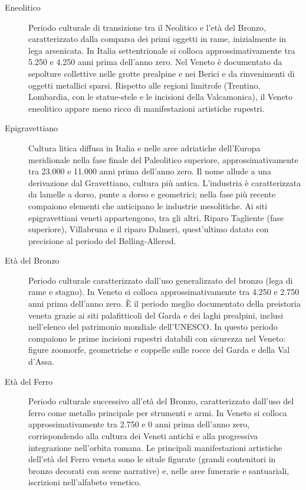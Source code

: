\begin{description}
\item[Eneolitico] Periodo culturale di transizione tra il Neolitico e l'età del Bronzo, caratterizzato dalla comparsa dei primi oggetti in rame, inizialmente in lega arsenicata. In Italia settentrionale si colloca approssimativamente tra 5.250 e 4.250 anni prima dell'anno zero. Nel Veneto è documentato da sepolture collettive nelle grotte prealpine e nei Berici e da rinvenimenti di oggetti metallici sparsi. Rispetto alle regioni limitrofe (Trentino, Lombardia, con le statue-stele e le incisioni della Valcamonica), il Veneto eneolitico appare meno ricco di manifestazioni artistiche rupestri.

\item[Epigravettiano] Cultura litica diffusa in Italia e nelle aree adriatiche dell'Europa meridionale nella fase finale del Paleolitico superiore, approssimativamente tra 23.000 e 11.000 anni prima dell'anno zero. Il nome allude a una derivazione dal Gravettiano, cultura più antica. L'industria è caratterizzata da lamelle a dorso, punte a dorso e geometrici; nella fase più recente compaiono elementi che anticipano le industrie mesolitiche. Ai siti epigravettiani veneti appartengono, tra gli altri, Riparo Tagliente (fase superiore), Villabruna e il riparo Dalmeri, quest'ultimo datato con precisione al periodo del Bølling-Allerød.

\item[Età del Bronzo] Periodo culturale caratterizzato dall'uso generalizzato del bronzo (lega di rame e stagno). In Veneto si colloca approssimativamente tra 4.250 e 2.750 anni prima dell'anno zero. È il periodo meglio documentato della preistoria veneta grazie ai siti palafitticoli del Garda e dei laghi prealpini, inclusi nell'elenco del patrimonio mondiale dell'UNESCO. In questo periodo compaiono le prime incisioni rupestri databili con sicurezza nel Veneto: figure zoomorfe, geometriche e coppelle sulle rocce del Garda e della Val d'Assa.

\item[Età del Ferro] Periodo culturale successivo all'età del Bronzo, caratterizzato dall'uso del ferro come metallo principale per strumenti e armi. In Veneto si colloca approssimativamente tra 2.750 e 0 anni prima dell'anno zero, corrispondendo alla cultura dei Veneti antichi e alla progressiva integrazione nell'orbita romana. Le principali manifestazioni artistiche dell'età del Ferro veneta sono le situle figurate (grandi contenitori in bronzo decorati con scene narrative) e, nelle aree funerarie e santuariali, iscrizioni nell'alfabeto venetico.


\end{description}
